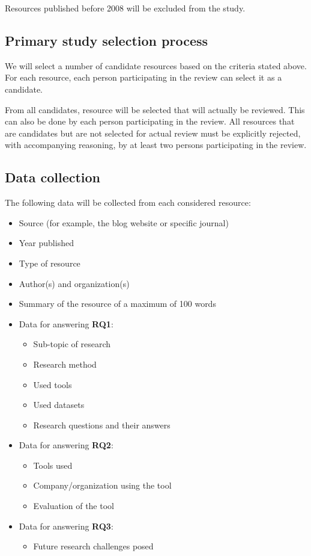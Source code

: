\documentclass[]{book}
\providecommand{\tightlist}{%
  \setlength{\itemsep}{0pt}\setlength{\parskip}{0pt}}
\begin{document}
Resources published before 2008 will be excluded from the study.

\subsection{Primary study selection
process}\label{primary-study-selection-process}

We will select a number of candidate resources based on the criteria
stated above. For each resource, each person participating in the review
can select it as a candidate.

From all candidates, resource will be selected that will actually be
reviewed. This can also be done by each person participating in the
review. All resources that are candidates but are not selected for
actual review must be explicitly rejected, with accompanying reasoning,
by at least two persons participating in the review.

\subsection{Data collection}\label{data-collection}

The following data will be collected from each considered resource:

\begin{itemize}
\tightlist
\item
  Source (for example, the blog website or specific journal)
\item
  Year published
\item
  Type of resource
\item
  Author(s) and organization(s)
\item
  Summary of the resource of a maximum of 100 words
\item
  Data for answering \textbf{RQ1}:

  \begin{itemize}
  \tightlist
  \item
    Sub-topic of research
  \item
    Research method
  \item
    Used tools
  \item
    Used datasets
  \item
    Research questions and their answers
  \end{itemize}
\item
  Data for answering \textbf{RQ2}:

  \begin{itemize}
  \tightlist
  \item
    Tools used
  \item
    Company/organization using the tool
  \item
    Evaluation of the tool
  \end{itemize}
\item
  Data for answering \textbf{RQ3}:

  \begin{itemize}
  \tightlist
  \item
    Future research challenges posed
  \end{itemize}
\end{itemize}
\end{document}
